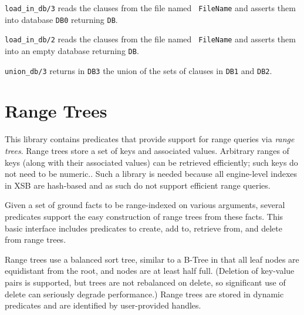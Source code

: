 \begin{description}
{\tt load\_in\_db/3} reads the clauses from the file named {\tt
FileName} and asserts them into database {\tt DB0} returning {\tt DB}.

{\tt load\_in\_db/2} reads the clauses from the file named {\tt
FileName} and asserts them into an empty database returning {\tt DB}.

{\tt union\_db/3} returns in {\tt DB3} the union of the sets of
clauses in {\tt DB1} and {\tt DB2}.

\end{description}

\section{Range Trees}

This library contains predicates that provide support for range
queries via {\em range trees}.  Range trees store a set of keys and
associated values.  Arbitrary ranges of keys (along with their
associated values) can be retrieved efficiently; such keys do not need
to be numeric..  Such a library is needed because all engine-level
indexes in XSB are hash-based and as such do not support efficient
range queries.

Given a set of ground facts to be range-indexed on various arguments,
several predicates support the easy construction of range trees from
these facts.  This basic interface includes predicates to create, add
to, retrieve from, and delete from range trees.

Range trees use a balanced sort tree, similar to a B-Tree in that all
leaf nodes are equidistant from the root, and nodes are at least half
full. (Deletion of key-value pairs is supported, but trees are not
rebalanced on delete, so significant use of delete can seriously
degrade performance.)  Range trees are stored in dynamic predicates 
and are identified by user-provided handles.


